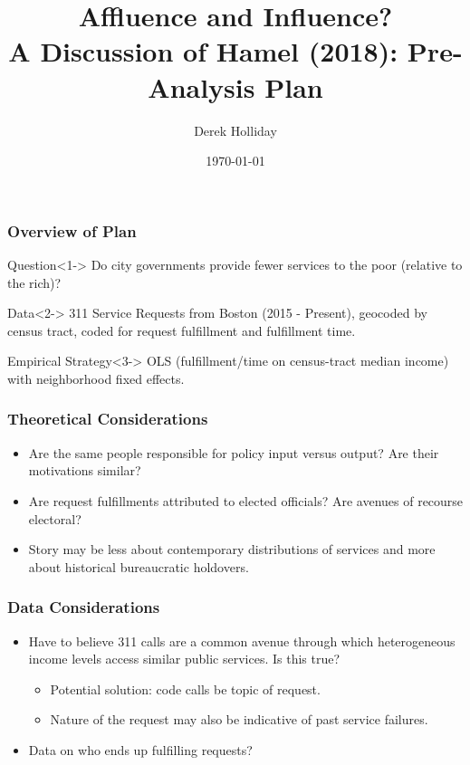 \documentclass{beamer}
\title[Hamel (2018) Discussion]{Affluence and Influence? \\
A Discussion of Hamel (2018): Pre-Analysis Plan}
\author{Derek Holliday}
\institute[UCLA]{University of California - Los Angeles}
\date{\today}
\begin{document}
\begin{frame}
\titlepage
\end{frame}

\begin{frame}
\frametitle{Overview of Plan}
\begin{block}{Question}<1->
Do city governments provide fewer services to the poor (relative to the rich)?
\end{block}

\begin{block}{Data}<2->
311 Service Requests from Boston (2015 - Present), geocoded by census tract, coded for request fulfillment and fulfillment time.
\end{block}

\begin{block}{Empirical Strategy}<3->
OLS (fulfillment/time on census-tract median income) with neighborhood fixed effects.
\end{block}
\end{frame}

\begin{frame}
\frametitle{Theoretical Considerations}
\begin{itemize}
	\item Are the same people  responsible for policy input versus output? Are their motivations similar?
	\pause
	\item Are request fulfillments attributed to elected officials? Are avenues of recourse electoral?
	\pause
	\item Story may be less about contemporary distributions of services and more about historical bureaucratic holdovers.
\end{itemize}
\end{frame}

\begin{frame}
\frametitle{Data Considerations}
\begin{itemize}
	\item Have to believe 311 calls are a common avenue through which heterogeneous income levels access similar public services. Is this true?
	\pause
	\begin{itemize}
		\item Potential solution: code calls be topic of request.
		\item Nature of the request may also be indicative of past service failures.
	\end{itemize}
	\pause
	\item Data on who ends up fulfilling requests?
\end{itemize}
\end{frame}
\end{document}
